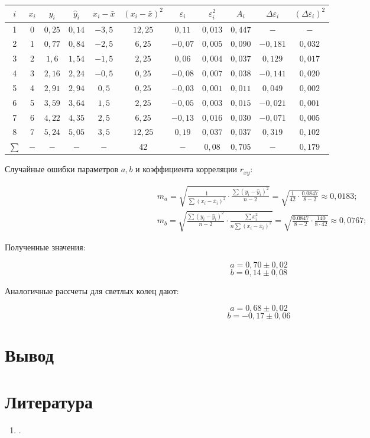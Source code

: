 \documentclass[a4paper, 12pt]{article}%
\begin{document}
\begin{tabular}{|c|c|c||c|c|c|c|c|c|c|c|}
\hline$i$ & $x_{i}$ & $y_{i}$ & $\hat{y}_{i}$ & $x_{i}-\bar{x}$ & $\left(x_{i}-\bar{x}\right)^{2}$ & $\varepsilon_{i}$ & $\varepsilon_{i}^{2}$ & $A_{i}$ & $\Delta \varepsilon_{i}$ & $\left(\Delta \varepsilon_{i}\right)^{2}$ \\
\hline 1 & 0 & $0,25$ & $0,14$ & $-3,5$ & $12,25$ & $0,11$ & $0,013$ & $0,447$ & $-$ & $-$ \\
\hline 2 & 1 & $0,77$ & $0,84$ & $-2,5$ & $6,25$ & $-0,07$ & $0,005$ & $0,090$ & $-0,181$ & $0,032$ \\
\hline 3 & 2 & $1,6$ & $1,54$ & $-1,5$ & $2,25$ & $0,06$ & $0,004$ & $0,037$ & $0,129$ & $0,017$ \\
\hline 4 & 3 & $2,16$ & $2,24$ & $-0,5$ & $0,25$ & $-0,08$ & $0,007$ & $0,038$ & $-0,141$ & $0,020$ \\
\hline 5 & 4 & $2,91$ & $2,94$ & $0,5$ & $0,25$ & $-0,03$ & $0,001$ & $0,011$ & $0,049$ & $0,002$ \\
\hline 6 & 5 & $3,59$ & $3,64$ & $1,5$ & $2,25$ & $-0,05$ & $0,003$ & $0,015$ & $-0,021$ & $0,001$ \\
\hline 7 & 6 & $4,22$ & $4,35$ & $2,5$ & $6,25$ & $-0,13$ & $0,016$ & $0,030$ & $-0,071$ & $0,005$ \\
\hline 8 & 7 & $5,24$ & $5,05$ & $3,5$ & $12,25$ & $0,19$ & $0,037$ & $0,037$ & $0,319$ & $0,102$ \\
\hline$\sum$ & $-$ & $-$ & $-$ & $-$ & 42 & $-$ & $0,08$ & $0,705$ & $-$ & $0,179$ \\
\hline
\end{tabular}


Случайные ошибки параметров $a, b$ и коэффициента корреляции $r_{x y}$:

$$
\begin{aligned}
&m_{a}=\sqrt{\frac{1}{\sum\left(x_{i}-\bar{x}_{i}\right)^{2}} \cdot \frac{\sum\left(y_{i}-\hat{y}_{i}\right)^{2}}{n-2}}=\sqrt{\frac{1}{42} \cdot \frac{0.0847}{8-2}} \approx 0,0183 ; \\
&m_{b}=\sqrt{\frac{\sum\left(y_{i}-\hat{y}_{i}\right)^{2}}{n-2} \cdot \frac{\sum x_{i}^{2}}{n \sum\left(x_{i}-\bar{x}_{i}\right)^{2}}}=\sqrt{\frac{0.0847}{8-2} \cdot \frac{140}{8 \cdot 42}} \approx 0,0767 ;
\end{aligned}
$$
	
Полученные значения:

\[ a = 0,70 \pm 0,02  \]
\[ b = 0,14 \pm 0,08  \]

Аналогичные рассчеты для светлых колец дают:

\[ a = 0,68 \pm 0,02  \]
\[ b = -0,17 \pm 0,06 \]


\section{Вывод}

 
\section{Литература}

\begin{enumerate}

\item .

\end{enumerate}	
\end{document}
